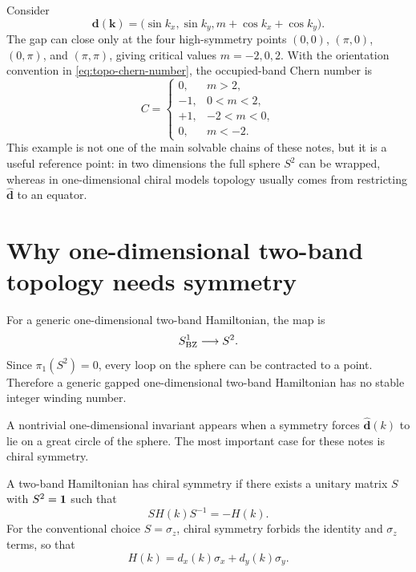 \begin{example}
\label{ex:topo-qwz-model}
Consider
\begin{equation}
\label{eq:topo-qwz-d-vector}
    \bm d(\bm k)=
    \bigl(
        \sin k_x,
        \sin k_y,
        m+\cos k_x+\cos k_y
    \bigr).
\end{equation}
The gap can close only at the four high-symmetry points
$(0,0)$, $(\pi,0)$, $(0,\pi)$, and $(\pi,\pi)$, giving critical values
$m=-2,0,2$.  With the orientation convention in
\cref{eq:topo-chern-number}, the occupied-band Chern number is
\begin{equation}
\label{eq:topo-qwz-chern-values}
    C=\begin{cases}
    0, & m>2,\\
    -1, & 0<m<2,\\
    +1, & -2<m<0,\\
    0, & m<-2.
    \end{cases}
\end{equation}
This example is not one of the main solvable chains of these notes, but it is a
useful reference point: in two dimensions the full sphere $S^2$ can be wrapped,
whereas in one-dimensional chiral models topology usually comes from restricting
$\widehat{\bm d}$ to an equator.
\end{example}

\section{Why one-dimensional two-band topology needs symmetry}
\label{sec:topo-1d-needs-symmetry}

For a generic one-dimensional two-band Hamiltonian, the map is
\begin{equation}
    S^1_{\rm BZ}\longrightarrow S^2 .
\end{equation}
Since $\pi_1(S^2)=0$, every loop on the sphere can be contracted to a point.
Therefore a generic gapped one-dimensional two-band Hamiltonian has no stable
integer winding number.

A nontrivial one-dimensional invariant appears when a symmetry forces
$\widehat{\bm d}(k)$ to lie on a great circle of the sphere.  The most important
case for these notes is chiral symmetry.

\begin{definition}
A two-band Hamiltonian has chiral symmetry if there exists a unitary matrix
$S$ with $S^2=\mathbf{1}$ such that
\begin{equation}
\label{eq:topo-chiral-symmetry-definition}
    S H(k) S^{-1}=-H(k).
\end{equation}
For the conventional choice $S=\sigma_z$, chiral symmetry forbids the identity
and $\sigma_z$ terms, so that
\begin{equation}
\label{eq:topo-chiral-two-band}
    H(k)=d_x(k)\sigma_x+d_y(k)\sigma_y.
\end{equation}
\end{definition}

